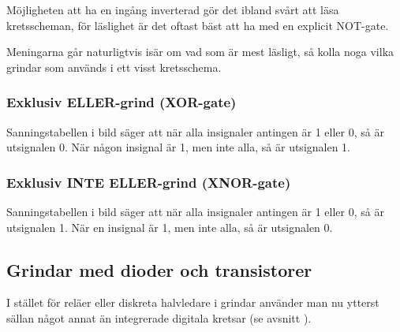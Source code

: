 \newpage
Möjligheten att ha en ingång inverterad gör det ibland svårt att läsa
kretsscheman, för läslighet är det oftast bäst att ha med en explicit NOT-gate.

\newpage
Meningarna går naturligtvis isär om vad som är mest läsligt, så kolla
noga vilka grindar som används i ett visst kretsschema.

\newpage



\subsubsection{Exklusiv ELLER-grind (XOR-gate)}

Sanningstabellen i bild  säger att när alla insignaler
antingen är 1 eller 0, så är utsignalen 0.
När någon insignal är 1, men inte alla, så är utsignalen 1.

\subsubsection{Exklusiv INTE ELLER-grind (XNOR-gate)}

Sanningstabellen i bild  säger att när alla insignaler
antingen är 1 eller 0, så är utsignalen 1.
När en insignal är 1, men inte alla, så är utsignalen 0.

\subsection{Grindar med dioder och transistorer}

I stället för reläer eller diskreta halvledare i grindar använder man nu ytterst
sällan något annat än integrerade digitala kretsar (se avsnitt
).


